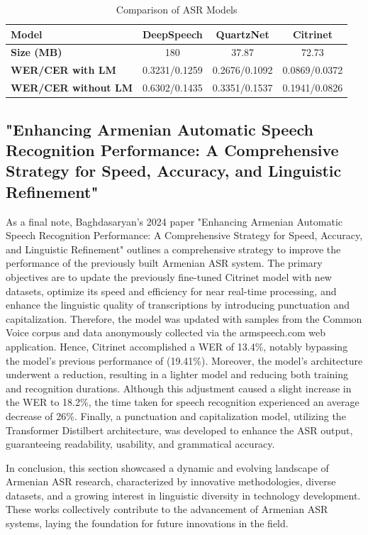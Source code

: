 \documentclass[conference]{IEEEtran}
\begin{document}
\begin{table}[htbp]
\centering
\caption{Comparison of ASR Models}
\label{tab:asr_comparison}
\begin{tabular}{@{}lccc@{}}
\toprule
\textbf{Model} & \textbf{DeepSpeech} & \textbf{QuartzNet} & \textbf{Citrinet} \\ \midrule
\textbf{Size (MB)} & 180 & 37.87 & 72.73 \\
\textbf{WER/CER with LM} & 0.3231/0.1259 & 0.2676/0.1092 & 0.0869/0.0372 \\
\textbf{WER/CER without LM} & 0.6302/0.1435 & 0.3351/0.1537 & 0.1941/0.0826 \\ \bottomrule
\end{tabular}
\end{table}

\subsection{"Enhancing Armenian Automatic Speech Recognition Performance: A Comprehensive Strategy for Speed, Accuracy, and Linguistic Refinement" \cite{baghdasaryan2024enhancing}}
As a final note, Baghdasaryan's 2024 paper "Enhancing Armenian Automatic Speech Recognition Performance: A Comprehensive Strategy for Speed, Accuracy, and Linguistic Refinement" outlines a comprehensive strategy to improve the performance of the previously built Armenian ASR system. The primary objectives are to update the previously fine-tuned Citrinet model with new datasets, optimize its speed and efficiency for near real-time processing, and enhance the linguistic quality of transcriptions by introducing punctuation and capitalization. Therefore, the model was updated with samples from the Common Voice corpus and data anonymously collected via the armspeech.com web application. Hence, Citrinet accomplished a WER of 13.4\%, notably bypassing the model's previous performance of (19.41\%). Moreover,  the model's architecture underwent a reduction, resulting in a lighter model and reducing both training and recognition durations. Although this adjustment caused a slight increase in the WER to 18.2\%, the time taken for speech recognition experienced an average decrease of 26\%. Finally, a punctuation and capitalization model, utilizing the Transformer Distilbert architecture, was developed to enhance the ASR output, guaranteeing readability, usability, and grammatical accuracy.


In conclusion, this section showcased a dynamic and evolving landscape of Armenian ASR research, characterized by innovative methodologies, diverse datasets, and a growing interest in linguistic diversity in technology development. These works collectively contribute to the advancement of Armenian ASR systems, laying the foundation for future innovations in the field.
\end{document}
